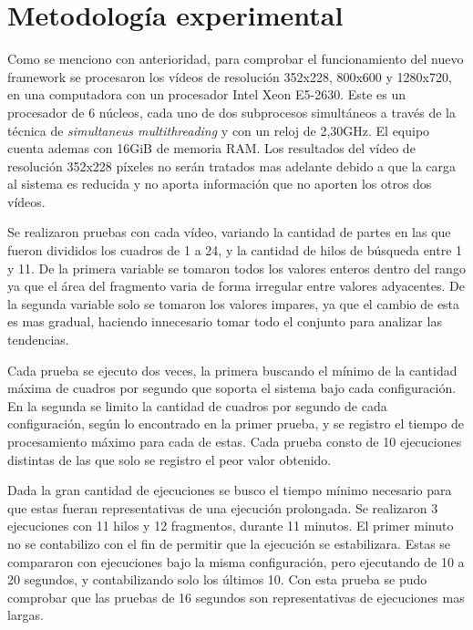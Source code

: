 
\section{Metodología experimental}

Como se menciono con anterioridad, para comprobar el funcionamiento del nuevo
framework se procesaron los vídeos de resolución 352x228, 800x600 y 1280x720, en
una computadora con un procesador Intel Xeon E5-2630. Este es un procesador de 6
núcleos, cada uno de dos subprocesos simultáneos a través de la técnica de
\emph{simultaneus multithreading} y con un reloj de 2,30GHz. El equipo cuenta
ademas con 16GiB de memoria RAM. Los resultados del vídeo de resolución 352x228
píxeles no serán tratados mas adelante debido a que la carga al sistema es
reducida y no aporta información que no aporten los otros dos vídeos.

Se realizaron pruebas con cada vídeo, variando la cantidad de partes en las que
fueron divididos los cuadros de 1 a 24, y la cantidad de hilos de búsqueda entre
1 y 11. De la primera variable se tomaron todos los valores enteros dentro del
rango ya que el área del fragmento varia de forma irregular entre valores
adyacentes. De la segunda variable solo se tomaron los valores impares, ya que
el cambio de esta es mas gradual, haciendo innecesario tomar todo el conjunto
para analizar las tendencias.

Cada prueba se ejecuto dos veces, la primera buscando el mínimo de la cantidad
máxima de cuadros por segundo que soporta el sistema bajo cada configuración. En
la segunda se limito la cantidad de cuadros por segundo de cada configuración,
según lo encontrado en la primer prueba, y se registro el tiempo de
procesamiento máximo para cada de estas. Cada prueba consto de 10 ejecuciones
distintas de las que solo se registro el peor valor obtenido.

Dada la gran cantidad de ejecuciones se busco el tiempo mínimo necesario para
que estas fueran representativas de una ejecución prolongada. Se realizaron 3
ejecuciones con 11 hilos y 12 fragmentos, durante 11 minutos. El primer minuto
no se contabilizo con el fin de permitir que la ejecución se estabilizara.
Estas se compararon con ejecuciones bajo la misma configuración, pero ejecutando
de 10 a 20 segundos, y contabilizando solo los últimos 10. Con esta prueba se
pudo comprobar que las pruebas de 16 segundos son representativas de ejecuciones
mas largas.


